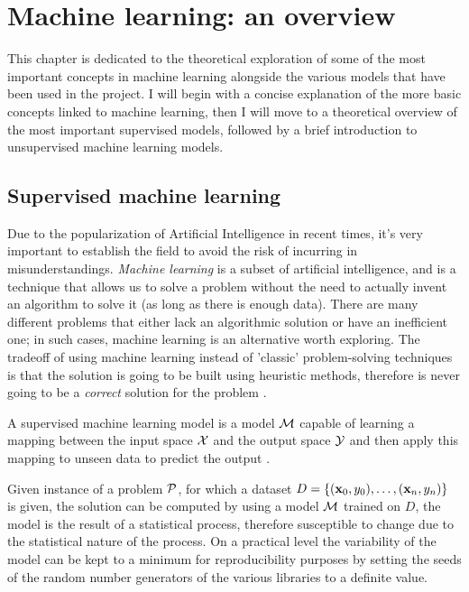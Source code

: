 \chapter{Machine learning: an overview}
\label{chp:ml}
This chapter is dedicated to the theoretical exploration of some of the most important concepts in
machine learning alongside the various models that have been used in the project. I will begin with
a concise explanation of the more basic concepts linked to machine learning, then I will move to a
theoretical overview of the most important supervised models, followed by a brief introduction to
unsupervised machine learning models.

\section{Supervised machine learning}
\label{sec:sml}
Due to the popularization of Artificial
Intelligence in recent times, it's very important to establish the field to avoid the risk of
incurring in misunderstandings. \emph{Machine learning} is a subset of artificial
intelligence, and is a technique that allows us to solve a problem without the need to actually invent an
algorithm to solve it (as long as there is enough data).  There are many different problems that
either lack an algorithmic solution or have an inefficient one; in such cases, machine learning is
an alternative worth exploring. The tradeoff of using machine learning instead of 'classic'
problem-solving techniques is that the solution is going to be built using heuristic methods,
therefore is never going to be a \emph{correct} solution for the problem \cite{Rebala2019}.

\medskip

A supervised machine learning model is a model $\mathcal{M}$ capable of learning a mapping between the
input space $\mathcal{X}$ and the output space $\mathcal{Y}$ and then apply this mapping to unseen
data to predict the output \cite{Cunningham2008}.

\smallskip

Given instance of a problem $\mathcal{P}$, for which a dataset $D = \{(\mathbf{x}_0, y_0), \ldots, (\mathbf{x}_n, y_n)\}$ is given, the solution can be
computed by using a model $\mathcal{M}$ trained on $D$, the model is the result of a statistical process,
therefore susceptible to change due to the statistical nature of the process. On a practical level
the variability of the model can be kept to a minimum for reproducibility purposes by setting the
seeds of the random number generators of the various libraries to a definite value.

